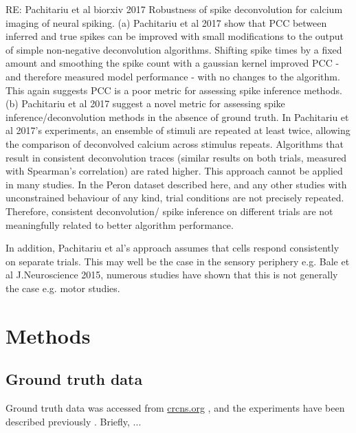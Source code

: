 \documentclass[a4paper,10pt,twocolumn]{article}
\begin{document}
RE: Pachitariu et al biorxiv 2017 Robustness of spike deconvolution for calcium imaging of neural spiking.
(a) Pachitariu et al 2017 show that PCC between inferred and true spikes can be improved with small modifications to the output of simple non-negative deconvolution algorithms. Shifting spike times by a fixed amount and smoothing the spike count with a gaussian kernel improved PCC - and therefore measured model performance - with no changes to the algorithm. This again suggests PCC is a poor metric for assessing spike inference methods.
(b) Pachitariu et al 2017 suggest a novel metric for assessing spike inference/deconvolution methods in the absence of ground truth. In Pachitariu et al 2017's experiments, an ensemble of stimuli are repeated at least twice, allowing the comparison of deconvolved calcium across stimulus repeats. Algorithms that result in consistent deconvolution traces (similar results on both trials, measured with Spearman's correlation) are rated higher. This approach cannot be applied in many studies. In the Peron dataset described here, and any other studies with unconstrained behaviour of any kind, trial conditions are not precisely repeated. Therefore, consistent deconvolution/ spike inference on different trials are not meaningfully related to better algorithm performance. 

In addition, Pachitariu et al's approach assumes that cells respond consistently on separate trials. This may well be the case in the sensory periphery e.g. Bale et al J.Neuroscience 2015, numerous studies have shown that this is not generally the case e.g. motor studies.


\clearpage
\section{Methods}
\subsection*{Ground truth data}
Ground truth data was accessed from \href{http://crcns.org/data-sets/methods/cai-1}{crcns.org} \citep{Svoboda2015-ym}, and the experiments have been described previously \cite{Chen2013-nv}. Briefly, ...
\end{document}

